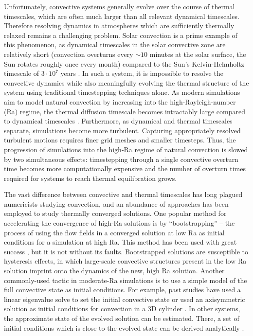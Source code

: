 \documentclass[aps, pre, onecolumn, nofootinbib, notitlepage, groupedaddress, amsfonts, amssymb, amsmath, longbibliography]{revtex4-1}
\begin{document}
Unfortunately, convective systems generally evolve over the course of thermal
timescales, which are often much larger than all relevant
dynamical timescales. Therefore resolving dynamics in atmospheres which are sufficiently
thermally relaxed remains a challenging problem.
Solar convection is a prime example of this phenomenon, as
dynamical timescales in the solar convective zone are relatively short 
(convection overturns every $\sim 10$ minutes at the solar surface, 
the Sun rotates roughly once every month)
compared to the Sun's Kelvin-Helmholtz timescale of
$3 \cdot 10^7$ years \cite{stix2003}.  
In such a system, it is impossible to resolve the convective dynamics while also
meaningfully evolving the thermal structure of the system using
traditional timestepping techniques alone.
As modern simulations aim to model natural convection
by increasing into the high-Rayleigh-number (Ra) regime,
the thermal diffusion timescale becomes intractably large
compared to dynamical timescales \cite{anders&brown2017}.
Furthermore, as dynamical and thermal timescales separate, 
simulations become more turbulent. Capturing appropriately resolved
turbulent motions requires finer grid meshes and smaller timesteps.
Thus, the progression of simulations into the high-Ra
regime of natural convection is slowed by two simultaneous effects: timestepping
through a single convective overturn time becomes more computationally expensive
and the number of overturn times required for systems to reach thermal equilibration
grows.

The vast difference between convective and thermal timescales has long plagued
numericists studying convection, and an abundance of approaches has been employed to
study thermally converged solutions. One popular method for accelerating the convergence
of high-Ra solutions is by ``bootstrapping'' -- the process of using the flow
fields in a converged solution at low Ra as initial conditions for a simulation at high
Ra.  This method has been used with great success \cite{johnston&doering2009, verzicco&camussi1997},
but it is not without its faults.  Bootstrapped solutions are susceptible to hysteresis
effects, in which large-scale convective structures present in the
low Ra solution imprint onto the dynamics of the new, high Ra solution. 
Another commonly-used tactic in
moderate-Ra simulations is to use 
a simple model of the full convective state as initial conditions.  
For example, past studies have used a linear eigenvalue solve to set the initial
convective state \cite{hurlburt&all1984} or used an axisymmetric solution 
as initial conditions for convection in a 3D cylinder \cite{verzicco&camussi1997}. 
In other systems, 
the approximate state of the evolved solution can be estimated. There, a
set of initial conditions which is close to the evolved state can be 
derived analytically \cite{couston&all2017, brandenburg&all2005}.
\end{document}
